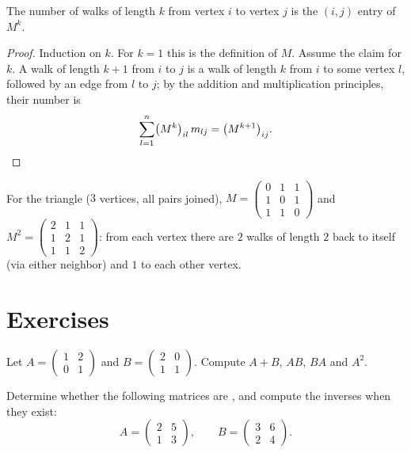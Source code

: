 \begin{theorem}\label{thm:g12:matrix:walks}
The number of walks of length $k$ from vertex $i$ to vertex $j$ is the
$(i,j)$ entry of $M^k$.
\end{theorem}

\begin{proof}
Induction on $k$. For $k = 1$ this is the definition of $M$. Assume the
claim for $k$. A walk of length $k+1$ from $i$ to $j$ is a walk of length
$k$ from $i$ to some vertex $l$, followed by an edge from $l$ to $j$; by the
addition and multiplication principles, their number is
\[
\sum_{l=1}^{n} \bigl(M^k\bigr)_{il}\, m_{lj} = \bigl(M^{k+1}\bigr)_{ij}.
\qedhere
\]
\end{proof}

\begin{example}
For the triangle  ($3$ vertices, all pairs joined),
$M = \begin{pmatrix} 0&1&1\\ 1&0&1\\ 1&1&0\end{pmatrix}$ and
$M^2 = \begin{pmatrix} 2&1&1\\ 1&2&1\\ 1&1&2\end{pmatrix}$: from each vertex
there are $2$ walks of length $2$ back to itself (via either neighbor) and
$1$ to each other vertex.
\end{example}

\section{Exercises}

\begin{exercise}[$\star$]\label{exo:g12:matrix:1}
Let $A = \begin{pmatrix} 1 & 2\\ 0 & 1 \end{pmatrix}$ and
$B = \begin{pmatrix} 2 & 0\\ 1 & 1 \end{pmatrix}$. Compute $A + B$, $AB$,
$BA$ and $A^2$.
\end{exercise}

\begin{exercise}[$\star$]\label{exo:g12:matrix:2}
Determine whether the following matrices are , and compute the
inverses when they exist:
\[
A = \begin{pmatrix} 2 & 5\\ 1 & 3\end{pmatrix}, \qquad
B = \begin{pmatrix} 3 & 6\\ 2 & 4\end{pmatrix}.
\]
\end{exercise}

